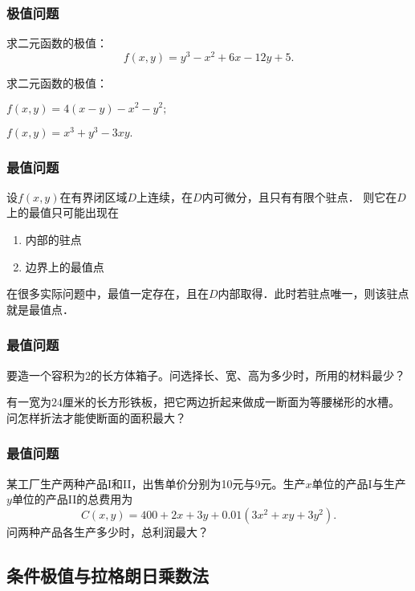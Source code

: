 \documentclass[14pt,notheorems,leqno,xcolor={rgb}]{beamer} %
\begin{document}
\begin{frame}
\frametitle{极值问题}
\begin{example}
求二元函数的极值：
$$f(x,y)=y^3-x^2+6x-12y+5.$$
\end{example}
\vpause
\begin{exercise}
求二元函数的极值：
\begin{enumlite}
  \item $f(x,y)=4(x-y)-x^2-y^2;$
  \item $f(x,y)=x^3+y^3-3xy.$
\end{enumlite}
\end{exercise}
\end{frame}

\begin{frame}
\frametitle{最值问题}
设$f(x,y)$在有界闭区域$D$上连续，在$D$内可微分，且只有有限个驻点．\pause
则它在$D$上的最值只可能出现在
\begin{multicols}{2}\begin{enumerate}%
  \item 内部的驻点 \item 边界上的最值点 
\end{enumerate}\end{multicols}
\pause\cdotfill\par
在很多实际问题中，最值一定存在，且在$D$内部取得．此时若驻点唯一，则该驻点就是最值点．
\end{frame}

\begin{frame}
\frametitle{最值问题}
\begin{example}
要造一个容积为$2$的长方体箱子。问选择长、宽、高为多少时，所用的材料最少？
\end{example}
\vpause
\begin{example}
有一宽为$24$厘米的长方形铁板，把它两边折起来做成一断面为等腰梯形的水槽。
问怎样折法才能使断面的面积最大？
\end{example}
\end{frame}

\begin{sframe}
\frametitle{最值问题}
\begin{example}
某工厂生产两种产品I和II，出售单价分别为10元与9元。生产$x$单位的产品I与生产$y$单位的产品II的总费用为
$$C(x,y)=400+2x+3y+0.01(3x^2+xy+3y^2).$$
问两种产品各生产多少时，总利润最大？
\end{example}
\end{sframe}

\subsection{条件极值与拉格朗日乘数法}
\end{document}
